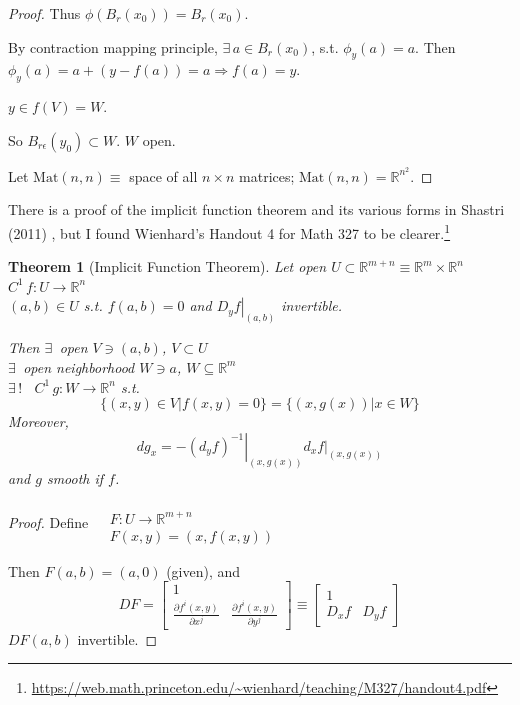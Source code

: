 \documentclass[10pt]{amsart}
\newtheorem{theorem}{Theorem}
\begin{document}
\begin{multicols*}{2}
\begin{proof}

Thus $\phi(B_r(x_0)) = B_r(x_0)$.

By contraction mapping principle, $\exists \, a \in B_r(x_0)$, s.t. $\phi_y(a)=a$.  Then $\phi_y(a) = a+ (y-f(a)) = a \Longrightarrow f(a) =y$.  

$y\in f(V) = W$.  

So $B_{r\epsilon}(y_0) \subset W$.  $W$ open.  

Let $\text{Mat}(n,n) \equiv $ space of all $n\times n$ matrices; $\text{Mat}(n,n)  = \mathbb{R}^{n^2}$.  


\end{proof}

There is a proof of the implicit function theorem and its various forms in Shastri (2011) \cite{AShastri2011}, but I found Wienhard's Handout 4 for Math 327 to be clearer.\footnote{\url{https://web.math.princeton.edu/~wienhard/teaching/M327/handout4.pdf}}

\begin{theorem}[Implicit Function Theorem]
Let open $U \subset \mathbb{R}^{m+n} \equiv \mathbb{R}^m \times \mathbb{R}^n$  \\
\phantom{Let} $C^1 \, f:U \to \mathbb{R}^n $ \\
\phantom{Let} $(a,b) \in U$ s.t. $f(a,b) = 0$ and $\left. D_y f\right|_{(a,b)}$ invertible.  

Then $\exists \, $ open $V \ni (a,b)$, $V \subset U$ \\
\phantom{Then} $\exists \, $ open neighborhood $W \ni a$, $W \subseteq \mathbb{R}^m$ \\
\phantom{Then} $\exists \, !$ \, $C^1 \, g:W \to \mathbb{R}^n$ s.t.
\[
\lbrace (x,y) \in V | f(x,y) =0 \rbrace = \lbrace (x,g(x)) | x \in W \rbrace
\]
Moreover,
\[
dg_x = - \left. (d_yf)^{-1} \right|_{(x,g(x))} \left. d_x f\right|_{(x,g(x))}
\]
and $g$ smooth if $f$.  
\end{theorem}

\begin{proof}
  Define $\begin{aligned} & \quad \\
    & F: U \to \mathbb{R}^{m+n}   \\
    & F(x,y) = (x,f(x,y)) \end{aligned}$

Then $F(a,b) = (a,0)$ (given), and 
\[
DF = \left[ \begin{matrix} 1 & \\ 
    \frac{ \partial f^i(x,y)}{ \partial x^j} & \frac{ \partial f^i(x,y) }{ \partial y^j } \end{matrix} \right] \equiv \left[ \begin{matrix} 1 & \\
    D_xf & D_yf \end{matrix} \right]
\]
$DF(a,b)$ invertible.  


\end{proof}
\end{multicols*}
\end{document}
